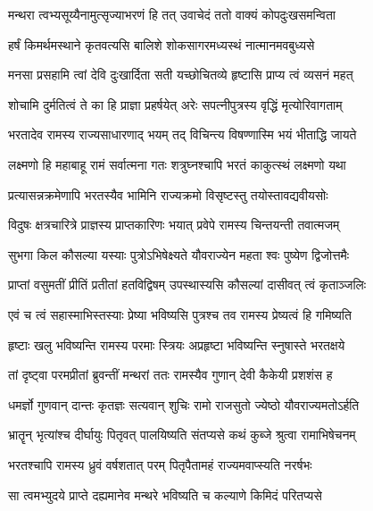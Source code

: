 
\twolineshloka
{मन्थरा त्वभ्यसूय्यैनामुत्सृज्याभरणं हि तत्}
{उवाचेदं ततो वाक्यं कोपदुःखसमन्विता} %

\twolineshloka
{हर्षं किमर्थमस्थाने कृतवत्यसि बालिशे}
{शोकसागरमध्यस्थं नात्मानमवबुध्यसे} %

\twolineshloka
{मनसा प्रसहामि त्वां देवि दुःखार्दिता सती}
{यच्छोचितव्ये हृष्टासि प्राप्य त्वं व्यसनं महत्} %

\twolineshloka
{शोचामि दुर्मतित्वं ते का हि प्राज्ञा प्रहर्षयेत्}
{अरेः सपत्नीपुत्रस्य वृद्धिं मृत्योरिवागताम्} %

\twolineshloka
{भरतादेव रामस्य राज्यसाधारणाद् भयम्}
{तद् विचिन्त्य विषण्णास्मि भयं भीताद्धि जायते} %

\twolineshloka
{लक्ष्मणो हि महाबाहू रामं सर्वात्मना गतः}
{शत्रुघ्नश्चापि भरतं काकुत्स्थं लक्ष्मणो यथा} %

\twolineshloka
{प्रत्यासन्नक्रमेणापि भरतस्यैव भामिनि}
{राज्यक्रमो विसृष्टस्तु तयोस्तावद्यवीयसोः} %

\twolineshloka
{विदुषः क्षत्रचारित्रे प्राज्ञस्य प्राप्तकारिणः}
{भयात् प्रवेपे रामस्य चिन्तयन्ती तवात्मजम्} %

\twolineshloka
{सुभगा किल कौसल्या यस्याः पुत्रोऽभिषेक्ष्यते}
{यौवराज्येन महता श्वः पुष्येण द्विजोत्तमैः} %

\twolineshloka
{प्राप्तां वसुमतीं प्रीतिं प्रतीतां हतविद्विषम्}
{उपस्थास्यसि कौसल्यां दासीवत् त्वं कृताञ्जलिः} %

\twolineshloka
{एवं च त्वं सहास्माभिस्तस्याः प्रेष्या भविष्यसि}
{पुत्रश्च तव रामस्य प्रेष्यत्वं हि गमिष्यति} %

\twolineshloka
{हृष्टाः खलु भविष्यन्ति रामस्य परमाः स्त्रियः}
{अप्रहृष्टा भविष्यन्ति स्नुषास्ते भरतक्षये} %

\twolineshloka
{तां दृष्ट्वा परमप्रीतां ब्रुवन्तीं मन्थरां ततः}
{रामस्यैव गुणान् देवी कैकेयी प्रशशंस ह} %

\twolineshloka
{धमर्ज्ञो गुणवान् दान्तः कृतज्ञः सत्यवान् शुचिः}
{रामो राजसुतो ज्येष्ठो यौवराज्यमतोऽर्हति} %

\twolineshloka
{भ्रातॄन् भृत्यांश्च दीर्घायुः पितृवत् पालयिष्यति}
{संतप्यसे कथं कुब्जे श्रुत्वा रामाभिषेचनम्} %

\twolineshloka
{भरतश्चापि रामस्य ध्रुवं वर्षशतात् परम्}
{पितृपैतामहं राज्यमवाप्स्यति नरर्षभः} %

\twolineshloka
{सा त्वमभ्युदये प्राप्ते दह्यमानेव मन्थरे}
{भविष्यति च कल्याणे किमिदं परितप्यसे} %


